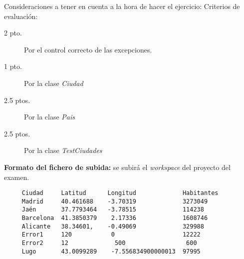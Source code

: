 \documentclass[addpoints,12pt]{exam}
\begin{document}
\begin{questions}
\begin{description}
\begin{itemize}
\end{itemize}
\end{description}
Consideraciones a tener en cuenta a la hora de hacer el ejercicio:
Criterios de evaluación:
\begin{description}
\item[2 pto.] Por el control correcto de las excepciones.
\item[1 pto.] Por la clase \emph{Ciudad}
\item[2.5 ptos.] Por la clase \emph{Pais}
\item[2.5 ptos.] Por la clase \emph{TestCiudades}
\end{description}
\textbf{Formato del fichero de subida:} se subirá el \emph{workspace} del proyecto del examen.
\end{questions}
\begin{verbatim}
     Ciudad     Latitud      Longitud             Habitantes
     Madrid     40.461688    -3.70319             3273049
     Jaén       37.7793464   -3.78515             114238
     Barcelona  41.3850379    2.17336             1608746
     Alicante   38.34601,    -0.49069             329988
     Error1     120	          0                   12222
     Error2     12	           500                 600
     Lugo       43.0099289    -7.556834900000013  97995
\end{verbatim}
\end{document}
